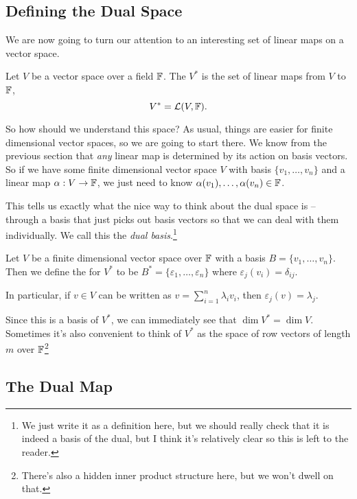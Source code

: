\documentclass[a4paper]{scrartcl}
\begin{document}
\subsection{Defining the Dual Space}

We are now going to turn our attention to an interesting set of linear maps on a vector space.

\begin{definition}
    Let $V$ be a vector space over a field $\mathbb{F}$. The  $V^*$ is the set of linear maps from $V$ to $\mathbb{F}$,
    $$
    V^* = \mathcal{L}(V, \mathbb{F}).
    $$
\end{definition}

So how should we understand this space?
As usual, things are easier for finite dimensional vector spaces, so we are going to start there. We know from the previous section that \emph{any} linear map is determined by its action on basis vectors. So if we have some finite dimensional vector space $V$ with basis $\{v_1, \dots, v_n\}$ and a linear map $\alpha: V \rightarrow \mathbb{F}$, we just need to know $\alpha(v_1), \dots, \alpha(v_n) \in \mathbb{F}$.

This tells us exactly what the nice way to think about the dual space is -- through a basis that just picks out basis vectors so that we can deal with them individually. We call this the \emph{dual basis}.\footnote{We just write it as a definition here, but we should really check that it is indeed a basis of the dual, but I think it's relatively clear so this is left to the reader.}

\begin{definition}
    Let $V$ be a finite dimensional vector space over $\mathbb{F}$ with a basis $B = \{v_1, \dots, v_n\}$. 
    Then we define the  for $V^*$ to be $B^* = \{\varepsilon_1, \dots, \varepsilon_n\}$ where $\varepsilon_j(v_i) = \delta_{ij}$.

    In particular, if $v \in V$ can be written as $v = \sum_{i = 1}^n \lambda_i v_i$, then $\varepsilon_j(v) = \lambda_j$.
\end{definition}

Since this is a basis of $V^*$, we can immediately see that $\dim V^* = \dim V$. Sometimes it's also convenient to think of $V^*$ as the space of row vectors of length $m$ over $\mathbb{F}$\footnote{There's also a hidden inner product structure here, but we won't dwell on that.}

\subsection{The Dual Map}
\end{document}
